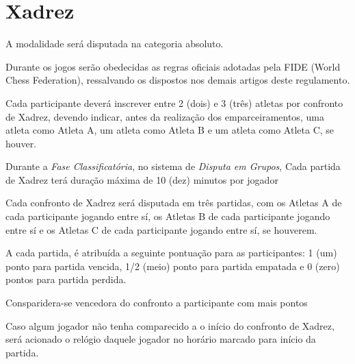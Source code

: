{\let\clearpage\relax \chapter{Xadrez}}

\begin{article}
	A modalidade será disputada na categoria absoluto.
\end{article}

\begin{article}
	Durante os jogos serão obedecidas as regras oficiais adotadas pela FIDE (World Chess Federation), ressalvando os dispostos nos demais artigos deste regulamento.
\end{article}

\begin{article}
	Cada participante deverá inscrever entre 2 (dois) e 3 (três) atletas por confronto de Xadrez, devendo indicar, antes da realização dos emparceiramentos, uma atleta como Atleta A, um atleta como Atleta B e um atleta como Atleta C, se houver.
\end{article}

\begin{article}
	Durante a \textit{Fase Classificatória}, no sistema de \textit{Disputa em Grupos}, Cada partida de Xadrez terá duração máxima de 10 (dez) minutos por jogador
\end{article}

\begin{article}
	Cada confronto de Xadrez será disputada em três partidas, com os Atletas A de cada participante jogando entre sí, os Atletas B de cada participante jogando entre sí e os Atletas C de cada participante jogando entre sí, se houverem.

	\begin{xparagraph}
		A cada partida, é atribuída a seguinte pontuação para as participantes: 1 (um) ponto para partida vencida, 1/2 (meio) ponto para partida empatada e 0 (zero) pontos para partida perdida.
	\end{xparagraph}

	\begin{xparagraph}
		Consparidera-se vencedora do confronto a participante com mais pontos
	\end{xparagraph}

	\begin{xparagraph}
		Caso algum jogador não tenha comparecido a o início do confronto de Xadrez, será acionado o relógio daquele jogador no horário marcado para início da partida.
	\end{xparagraph}
\end{article}

